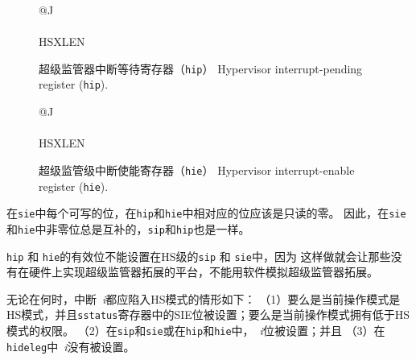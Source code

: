 \begin{figure}[h!]
{\footnotesize
\begin{center}
\begin{tabular}{@{}J}
 \\
\hline
{} \\
\hline
HSXLEN \\
\end{tabular}
\end{center}
}
\vspace{-0.1in}
\caption{超级监管器中断等待寄存器（{\tt hip}） Hypervisor interrupt-pending register ({\tt hip}).}
\label{hipreg}
\end{figure}

\begin{figure}[h!]
{\footnotesize
\begin{center}
\begin{tabular}{@{}J}
 \\
\hline
{} \\
\hline
HSXLEN \\
\end{tabular}
\end{center}
}
\vspace{-0.1in}
\caption{超级监管级中断使能寄存器（{\tt hie}） Hypervisor interrupt-enable register ({\tt hie}).}
\label{hiereg}
\end{figure}

在{\tt sie}中每个可写的位，在{\tt hip}和{\tt hie}中相对应的位应该是只读的零。
因此，在{\tt sie}和{\tt hie}中非零位总是互补的，{\tt sip}和{\tt hip}也是一样。

\begin{commentary}
  {\tt hip} 和 {\tt hie}的有效位不能设置在HS级的{\tt sip} 和 {\tt sie}中，因为
  这样做就会让那些没有在硬件上实现超级监管器拓展的平台，不能用软件模拟超级监管器拓展。
\end{commentary}

无论在何时，中断~\textit{i}都应陷入HS模式的情形如下：
（1）要么是当前操作模式是HS模式，并且{\tt sstatus}寄存器中的SIE位被设置；要么是当前操作模式拥有低于HS模式的权限。
（2）在{\tt sip}和{\tt sie}或在{\tt hip}和{\tt hie}中，~\textit{i}位被设置；并且
（3）在{\tt hideleg}中~\textit{i}没有被设置。

